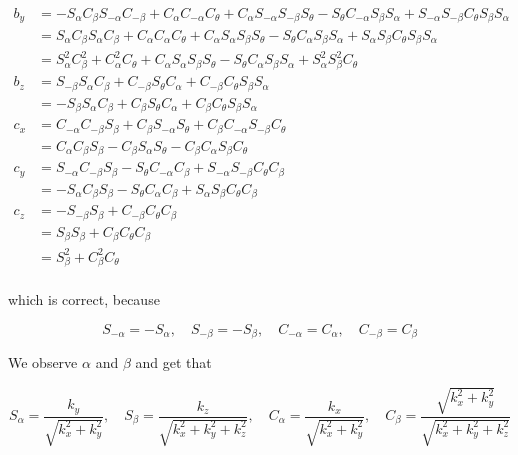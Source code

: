 \documentclass[a4paper,11pt]{article}
\begin{document}
\begin {enumerate}
\begin{align*}
			b_y &= -S_{\alpha}C_{\beta}S_{-\alpha}C_{-\beta} + C_{\alpha}C_{-\alpha}C_{\theta} + C_{\alpha}S_{-\alpha}S_{-\beta}S_{\theta} - S_{\theta}C_{-\alpha}S_{\beta}S_{\alpha} + S_{-\alpha}S_{-\beta}C_{\theta}S_{\beta}S_{\alpha}\\
			&= S_{\alpha}C_{\beta}S_{\alpha}C_{\beta} + C_{\alpha}C_{\alpha}C_{\theta} + C_{\alpha}S_{\alpha}S_{\beta}S_{\theta} - S_{\theta}C_{\alpha}S_{\beta}S_{\alpha} + S_{\alpha}S_{\beta}C_{\theta}S_{\beta}S_{\alpha}\\
			&= S_{\alpha}^2C_{\beta}^2 + C_{\alpha}^2C_{\theta} + C_{\alpha}S_{\alpha}S_{\beta}S_{\theta} - S_{\theta}C_{\alpha}S_{\beta}S_{\alpha} + S_{\alpha}^2S_{\beta}^2C_{\theta}\\
			b_z &= S_{-\beta}S_{\alpha}C_{\beta} + C_{-\beta}S_{\theta}C_{\alpha} + C_{-\beta}C_{\theta}S_{\beta}S_{\alpha}\\
			&= -S_{\beta}S_{\alpha}C_{\beta} + C_{\beta}S_{\theta}C_{\alpha} + C_{\beta}C_{\theta}S_{\beta}S_{\alpha}\\
			c_x &= C_{-\alpha}C_{-\beta}S_{\beta} + C_{\beta}S_{-\alpha}S_{\theta} + C_{\beta}C_{-\alpha}S_{-\beta}C_{\theta}\\
			&= C_{\alpha}C_{\beta}S_{\beta} - C_{\beta}S_{\alpha}S_{\theta} - C_{\beta}C_{\alpha}S_{\beta}C_{\theta}\\
			c_y &= S_{-\alpha}C_{-\beta}S_{\beta} - S_{\theta}C_{-\alpha}C_{\beta} + S_{-\alpha}S_{-\beta}C_{\theta}C_{\beta}\\
			&= -S_{\alpha}C_{\beta}S_{\beta} - S_{\theta}C_{\alpha}C_{\beta} + S_{\alpha}S_{\beta}C_{\theta}C_{\beta}\\
			c_z &= -S_{-\beta}S_{\beta} + C_{-\beta}C_{\theta}C_{\beta}\\
			&= S_{\beta}S_{\beta} + C_{\beta}C_{\theta}C_{\beta}\\
			&= S_{\beta}^2 + C_{\beta}^2C_{\theta}\\
		\end{align*}
		
		which is correct, because
		
		$$S_{-\alpha} = -S_{\alpha}, \quad S_{-\beta} = -S_{\beta}, \quad C_{-\alpha} = C_{\alpha}, \quad C_{-\beta} = C_{\beta}$$
		
		We observe $\alpha$ and $\beta$ and get that
		
		$$S_{\alpha} = \frac{k_y}{\sqrt{k_x^2 + k_y^2}}, \quad S_{\beta} = \frac{k_z}{\sqrt{k_x^2+k_y^2+k_z^2}}, \quad C_{\alpha} = \frac{k_x}{\sqrt{k_x^2 + k_y^2}}, \quad C_{\beta} = \frac{\sqrt{k_x^2 + k_y^2}}{\sqrt{k_x^2+k_y^2+k_z^2}}$$
		

\end{enumerate}
\end{document}
